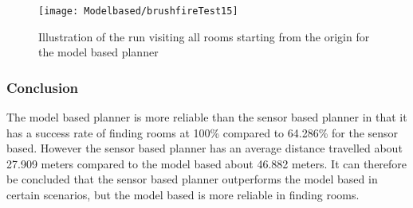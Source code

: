 \documentclass[../Head/Main.tex]{subfiles}
\begin{document}





\begin{figure}[H]
	\centering
	\texttt{[image: Modelbased/brushfireTest15]}
	\caption{Illustration of the run visiting all rooms starting from the origin for the model based planner}
	\label{fig:Test15}
\end{figure}

\subsubsection*{Conclusion}

The model based planner is more reliable than the sensor based planner in that it has a success rate of finding rooms at 100\% compared to 64.286\% for the sensor based. However the sensor based planner has an average distance travelled about 27.909 meters compared to the model based about 46.882 meters. It can therefore be concluded that the sensor based planner outperforms the model based in certain scenarios, but the model based is more reliable in finding rooms. 
\end{document}
